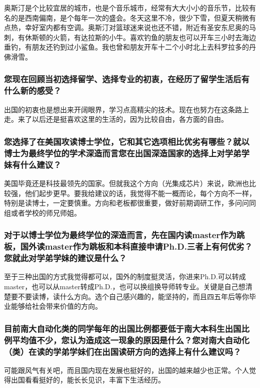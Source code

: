 \documentclass[a4paper,UTF8]{book}
\begin{document}
    奥斯汀是个比较宜居的城市，也是个音乐城市，经常有大大小小的音乐节，比较有名的是西南偏南，是个每年一次的盛会。冬天这里不冷，很少下雪，但夏天稍微有点热，幸好室内都有空调。奥斯汀对篮球迷来说也还不错，附近有圣安东尼奥的马刺，有休斯顿的火箭，有达拉斯的小牛。喜欢钓鱼的朋友也可以开车三小时去海边垂钓，有朋友还钓到过小鲨鱼。我也曾和朋友开车十二个小时北上去科罗拉多的丹佛滑雪。    
    
    \subsubsection*{您现在回顾当初选择留学、选择专业的初衷，在经历了留学生活后有什么新的感受？}
    出国的初衷也是想出来开阔眼界，学习点高精尖的技术。现在也努力在这条路上走。来了以后还是挺喜欢这里的生活的，因为比较自由，各方面的自由。
    
    \subsubsection*{您选择了在美国攻读博士学位，它和其它选项相比优劣有哪些？就以博士为最终学位的学术深造而言您在出国深造国家的选择上对学弟学妹有什么建议？}
    美国毕竟还是科技最领先的国家。但就我这个方向（光集成芯片）来说，欧洲也比较强，他们起步更早。要我给建议的话，我觉得不能一概而论，每个方向不一样，特别是读博士，一定要慎重。方向和老板都很重要，做好前期调研工作，多问问同组或者学校的师兄师姐。

    \subsubsection*{对于以博士学位为最终学位的深造而言，先在国内读master作为跳板，国外读master作为跳板和本科直接申请Ph.D.三者上有何优劣？您就此对学弟学妹的建议是什么？}
    至于三种出国的方式我觉得都可以，国外的制度挺灵活，你进来Ph.D.可以转成master，也可以从master转成Ph.D.，也可以换组换导师转专业。关键是自己想清楚要不要读博，读什么方向。选个自己感兴趣的，能坚持的，而且四五年后等你毕业能够给社会带来价值的方向。

    \subsubsection*{目前南大自动化类的同学每年的出国比例都要低于南大本科生出国比例平均值不少，您认为造成这一现象的原因是什么？您对南大自动化（类）在读的学弟学妹们在出国读研方向的选择上有什么建议吗？}
    可能跟风气有关吧，而且国内现在发展也挺好的，出国的越来越少也正常。个人觉得出国看看挺好的，能长长见识，丰富下生活经历。
    
\end{document}
